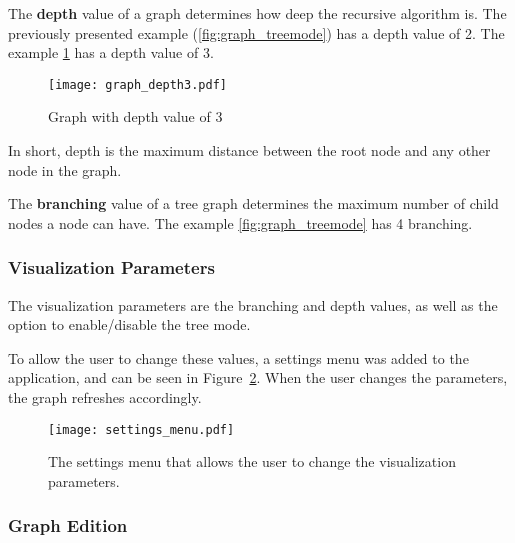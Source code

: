       The \textbf{depth} value of a graph determines how deep the recursive algorithm is.
      The previously presented example (\ref{fig:graph_treemode}) has a depth value of 2.
      The example \ref{fig:graph_depth3} has a depth value of 3.

      \begin{figure}[hb]
        \begin{center}
          \texttt{[image: graph\_depth3.pdf]}
        \end{center}
        \caption{Graph with depth value of 3}
        \label{fig:graph_depth3}
      \end{figure}
      In short, depth is the maximum distance between the root node and any other node in the graph.

      The \textbf{branching} value of a tree graph determines the maximum number of child nodes a node can have.
      The example \ref{fig:graph_treemode} has 4 branching.


    \subsubsection{Visualization Parameters} %
    \label{ssub:visualization_parameters}
    
    The visualization parameters are the branching and depth values, as well as the option to enable/disable the tree mode.

    To allow the user to change these values, a settings menu was added to the application, and can be seen in Figure~\ref{fig:settings_menu}.
    When the user changes the parameters, the graph refreshes accordingly.

    \begin{figure}[H]
      \begin{center}
        \texttt{[image: settings\_menu.pdf]}
      \end{center}
      \caption{The settings menu that allows the user to change the visualization parameters.}
      \label{fig:settings_menu} 
    \end{figure}


    \subsubsection{Graph Edition} %
      \label{ssub:edition}

